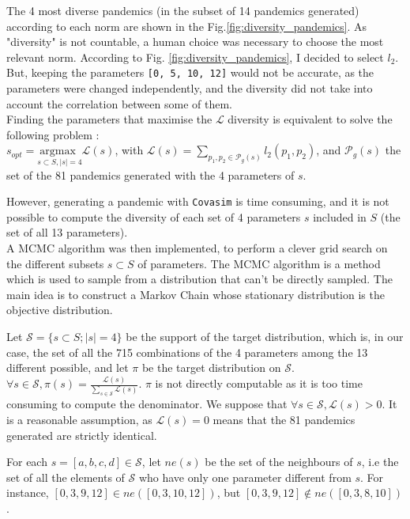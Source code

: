 The 4 most diverse pandemics (in the subset of 14 pandemics generated) according to each norm are shown in the Fig.\ref{fig:diversity_pandemics}.
As "diversity" is not countable, a human choice was necessary to choose the most relevant norm.
According to Fig. \ref{fig:diversity_pandemics}, I decided to select ${l}_2$.
But, keeping the parameters \texttt{[0, 5, 10, 12]} would not be accurate, as the parameters were changed independently, and the diversity did not take into account the correlation between some of them. \\

Finding the parameters that maximise the $\mathcal{L}$ diversity is equivalent to solve the following problem : \\

$ s_{opt} = \underset{s \subset S , \vert s \vert =4 }{\text{argmax } } \mathcal{ L}(s)$, with $ \mathcal{L}(s)= \sum_{p_1, p_2 \in \mathcal{P}_g(s)  }{l_2(p_1,p_2)}$, and  $\mathcal{P}_{g}(s)$ the set of the 81 pandemics generated with the 4 parameters of $s$.

However, generating a pandemic with \texttt{Covasim} is time consuming, and it is not possible to compute the diversity of each set of 4 parameters $s$ included in $S$ (the set of all 13 parameters).\\[1cm]


A MCMC algorithm \cite*{diaconis2009markov} was then implemented, to perform a clever grid search on the different subsets $s \subset S $ of parameters.
The MCMC algorithm is a method which is used to sample from a distribution that can't be directly sampled. 
The main idea is to construct a Markov Chain whose stationary distribution is the objective distribution.

Let $\mathcal{S} = \{ s\subset S ;  \vert s \vert = 4 \}$ be the support of the target distribution, which is, in our case, the set of all the 715 combinations of the 4 parameters among the 13 different possible, and let $\pi$ be the target distribution on $\mathcal{S}$.
$\forall s \in \mathcal{S}, \pi(s) = \frac{\mathcal{L}(s)}{\sum_{s \in \mathcal{S}}  \mathcal{L}(s)} $. $\pi$ is not directly computable as it is too time consuming to compute the denominator.
We suppose that $\forall s \in \mathcal{S}, \mathcal{L}(s) >0$.
It is a reasonable assumption, as $\mathcal{L}(s) = 0 $ means that the 81 pandemics generated   are strictly identical. 

For each $s = [a, b, c, d] \in \mathcal{S}$, let $ne(s)$ be the set of the neighbours of $s$, i.e the set of all the elements of $\mathcal{S}$ who have only one parameter different from $s$. 
For instance, $[0, 3, 9, 12] \in ne([0, 3, 10, 12])$, but $[0, 3, 9, 12] \notin ne([0, 3, 8, 10])$.\\


